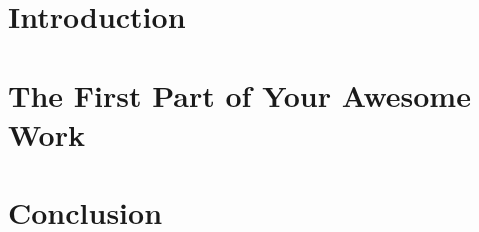 \documentclass[11pt,letterpaper,oneside,openany]{report}
\begin{document}












\doublespacing
{}

\chapter{Introduction}
\label{chap:chap1}


\chapter{The First Part of Your Awesome Work}
\label{chap:chap2}







\chapter{Conclusion}
\Blindtext


\cleardoublepage
{}
{}








\newpage
{}
{}

\end{document}
